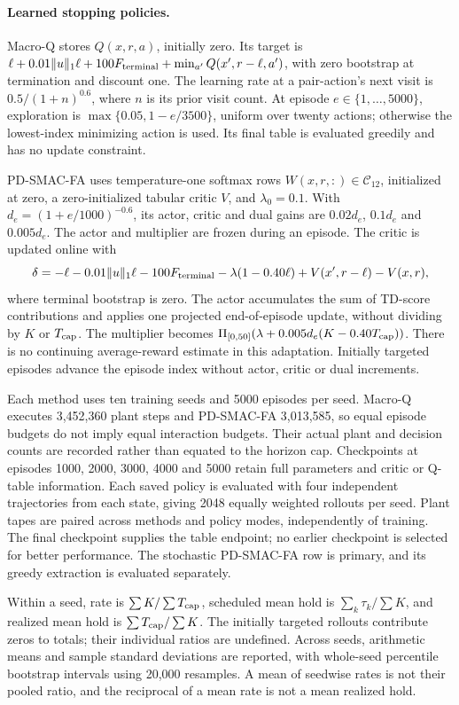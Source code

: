 \documentclass[11pt]{article}
\newcommand{\1}{\mathbf{1}}
\newcommand{\proj}{\Pi}
\begin{document}
\paragraph{Learned stopping policies.}
Macro-Q stores $Q(x,r,a)$, initially zero. Its target is $\ell+0.01\|u\|_1\ell+100F_{\rm terminal}+\min_{a'}Q(x',r-\ell,a')$, with zero bootstrap at termination and discount one. The learning rate at a pair-action's next visit is $0.5/(1+n)^{0.6}$, where $n$ is its prior visit count. At episode $e\in\{1,\ldots,5000\}$, exploration is $\max\{0.05,1-e/3500\}$, uniform over twenty actions; otherwise the lowest-index minimizing action is used. Its final table is evaluated greedily and has no update constraint.

PD-SMAC-FA uses temperature-one softmax rows $W(x,r,:)\in\mathcal C_{12}$, initialized at zero, a zero-initialized tabular critic $V$, and $\lambda_0=0.1$. With $d_e=(1+e/1000)^{-0.6}$, its actor, critic and dual gains are $0.02d_e$, $0.1d_e$ and $0.005d_e$. The actor and multiplier are frozen during an episode. The critic is updated online with
\[
 \delta=-\ell-0.01\|u\|_1\ell-100F_{\rm terminal}
 -\lambda(1-0.40\ell)+V(x',r-\ell)-V(x,r),
\]
where terminal bootstrap is zero. The actor accumulates the sum of TD-score contributions and applies one projected end-of-episode update, without dividing by $K$ or $T_{\rm cap}$. The multiplier becomes $\proj_{[0,50]}(\lambda+0.005d_e(K-0.40T_{\rm cap}))$. There is no continuing average-reward estimate in this adaptation. Initially targeted episodes advance the episode index without actor, critic or dual increments.

Each method uses ten training seeds and 5000 episodes per seed. Macro-Q executes 3,452,360 plant steps and PD-SMAC-FA 3,013,585, so equal episode budgets do not imply equal interaction budgets. Their actual plant and decision counts are recorded rather than equated to the horizon cap. Checkpoints at episodes 1000, 2000, 3000, 4000 and 5000 retain full parameters and critic or Q-table information. Each saved policy is evaluated with four independent trajectories from each state, giving 2048 equally weighted rollouts per seed. Plant tapes are paired across methods and policy modes, independently of training. The final checkpoint supplies the table endpoint; no earlier checkpoint is selected for better performance. The stochastic PD-SMAC-FA row is primary, and its greedy extraction is evaluated separately.

Within a seed, rate is $\sum K/\sum T_{\rm cap}$, scheduled mean hold is $\sum_k\tau_k/\sum K$, and realized mean hold is $\sum T_{\rm cap}/\sum K$. The initially targeted rollouts contribute zeros to totals; their individual ratios are undefined. Across seeds, arithmetic means and sample standard deviations are reported, with whole-seed percentile bootstrap intervals using 20,000 resamples. A mean of seedwise rates is not their pooled ratio, and the reciprocal of a mean rate is not a mean realized hold.
\end{document}
